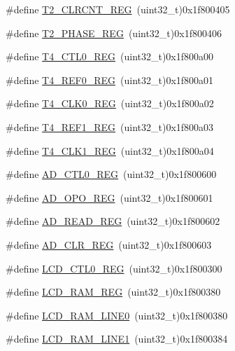 \begin{DoxyCompactItemize}
\item 
\#define \mbox{\hyperlink{a00020_adbe130a3cc7c3109bab2ae344fcdcc11}{T2\+\_\+\+C\+L\+R\+C\+N\+T\+\_\+\+R\+EG}}~(uint32\+\_\+t)0x1f800405
\item 
\#define \mbox{\hyperlink{a00020_a186d446896bf8b88b2ee0da5b726c680}{T2\+\_\+\+P\+H\+A\+S\+E\+\_\+\+R\+EG}}~(uint32\+\_\+t)0x1f800406
\item 
\#define \mbox{\hyperlink{a00020_a83136367fd85cd43cec90995ad0f51ef}{T4\+\_\+\+C\+T\+L0\+\_\+\+R\+EG}}~(uint32\+\_\+t)0x1f800a00
\item 
\#define \mbox{\hyperlink{a00020_af1510d89e9870fc9e249f7daac1f97ac}{T4\+\_\+\+R\+E\+F0\+\_\+\+R\+EG}}~(uint32\+\_\+t)0x1f800a01
\item 
\#define \mbox{\hyperlink{a00020_af2047cbb251e0693548f017a0874efbf}{T4\+\_\+\+C\+L\+K0\+\_\+\+R\+EG}}~(uint32\+\_\+t)0x1f800a02
\item 
\#define \mbox{\hyperlink{a00020_a4bd6b4b65a316a149e4b017972a567f8}{T4\+\_\+\+R\+E\+F1\+\_\+\+R\+EG}}~(uint32\+\_\+t)0x1f800a03
\item 
\#define \mbox{\hyperlink{a00020_a0cf35c2ea2894506f697dce7f06003a4}{T4\+\_\+\+C\+L\+K1\+\_\+\+R\+EG}}~(uint32\+\_\+t)0x1f800a04
\item 
\#define \mbox{\hyperlink{a00020_a7c90725a1b307a000a44211bcb115a47}{A\+D\+\_\+\+C\+T\+L0\+\_\+\+R\+EG}}~(uint32\+\_\+t)0x1f800600
\item 
\#define \mbox{\hyperlink{a00020_aeca2931f15b40d772a94a66e4641619e}{A\+D\+\_\+\+O\+P\+O\+\_\+\+R\+EG}}~(uint32\+\_\+t)0x1f800601
\item 
\#define \mbox{\hyperlink{a00020_af59f8074e13f7a5c80f07dc7c27c0610}{A\+D\+\_\+\+R\+E\+A\+D\+\_\+\+R\+EG}}~(uint32\+\_\+t)0x1f800602
\item 
\#define \mbox{\hyperlink{a00020_a909cbad2fef284b18a87a5bb1395ef11}{A\+D\+\_\+\+C\+L\+R\+\_\+\+R\+EG}}~(uint32\+\_\+t)0x1f800603
\item 
\#define \mbox{\hyperlink{a00020_adc8a1acb1d3dc976ed3747d978e7b46e}{L\+C\+D\+\_\+\+C\+T\+L0\+\_\+\+R\+EG}}~(uint32\+\_\+t)0x1f800300
\item 
\#define \mbox{\hyperlink{a00020_a09e3b2dc0284d0ad190df03fc438bc46}{L\+C\+D\+\_\+\+R\+A\+M\+\_\+\+R\+EG}}~(uint32\+\_\+t)0x1f800380
\item 
\#define \mbox{\hyperlink{a00020_a126a24a9996154747b8a9b515583d405}{L\+C\+D\+\_\+\+R\+A\+M\+\_\+\+L\+I\+N\+E0}}~(uint32\+\_\+t)0x1f800380
\item 
\#define \mbox{\hyperlink{a00020_aeb932aa8930c0688ce485816d412d56e}{L\+C\+D\+\_\+\+R\+A\+M\+\_\+\+L\+I\+N\+E1}}~(uint32\+\_\+t)0x1f800384

\end{DoxyCompactItemize}
